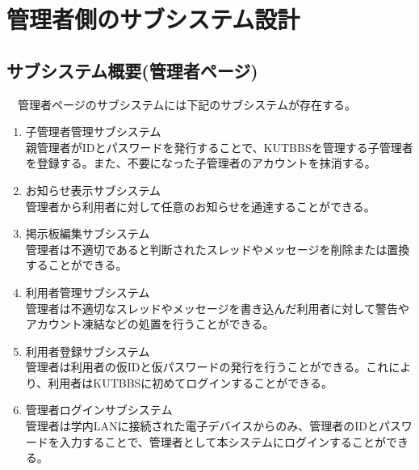 \documentclass[a4j]{jarticle}
\begin{document}
\section{管理者側のサブシステム設計}

\subsection{サブシステム概要(管理者ページ)}
　管理者ページのサブシステムには下記のサブシステムが存在する。
\begin{enumerate}
  \item 子管理者管理サブシステム\\
  親管理者がIDとパスワードを発行することで、KUTBBSを管理する子管理者を登録する。また、不要になった子管理者のアカウントを抹消する。
\\

  \item お知らせ表示サブシステム\\
  管理者から利用者に対して任意のお知らせを通達することができる。
\\

  \item 掲示板編集サブシステム\\
  管理者は不適切であると判断されたスレッドやメッセージを削除または置換することができる。
\\

  \item 利用者管理サブシステム\\
  管理者は不適切なスレッドやメッセージを書き込んだ利用者に対して警告やアカウント凍結などの処置を行うことができる。
\\

  \item 利用者登録サブシステム\\
  管理者は利用者の仮IDと仮パスワードの発行を行うことができる。これにより、利用者はKUTBBSに初めてログインすることができる。
\\

  \item 管理者ログインサブシステム\\
  管理者は学内LANに接続された電子デバイスからのみ、管理者のIDとパスワードを入力することで、管理者として本システムにログインすることができる。
\end{enumerate}
\end{document}

